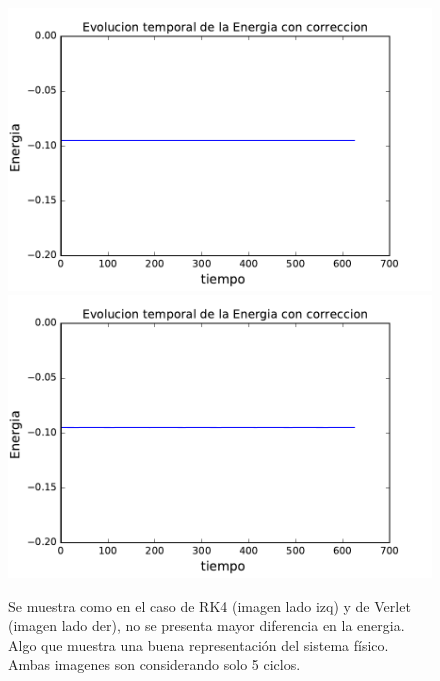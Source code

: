 \documentclass[10pt]{article}
\begin{document}
\begin{figure}[H]
\centering
\includegraphics[scale=0.5]{energia_rk4_5.pdf}
\includegraphics[scale=0.5]{energia_verlet_5.pdf}
\caption{Se muestra como en el caso de RK4 (imagen lado izq) y de Verlet (imagen lado der), no se presenta mayor diferencia en la energia. Algo que muestra una buena representación del sistema físico. Ambas imagenes son considerando solo 5 ciclos.}
\label{img_energia_5}
\end{figure}
\end{document}

